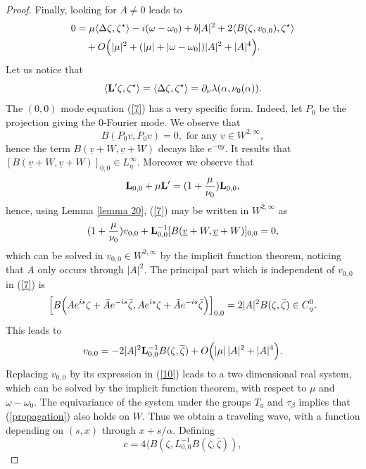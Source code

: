 \documentclass[11pt]{article}
\begin{document}
\begin{proof}
Finally, looking for $A \ne 0$ leads to
\begin{align} \label{10}
0 &= \mu \langle \Delta \zeta, \zeta^\star \rangle- i (\omega - \omega_0)
+ b |A|^2 + 2 \langle B(\zeta,v_{0,0}), \zeta^\star \rangle
\\ & \quad
+ O \Bigl(  |\mu|^2 + (|\mu| + |\omega - \omega_0| ) |A|^2 + |A|^4 \Bigr).
\end{align}
Let us notice that
$$
\langle {\bf L}' \zeta, \zeta^\star \rangle 
= \langle \Delta \zeta, \zeta^\star \rangle
= \partial_\nu \lambda(\alpha,\nu_0(\alpha)).
$$
The $(0,0)$ mode equation  (\ref{7}) has a very specific form. Indeed, let $P_0$ be the projection giving the 0-Fourier mode.  We observe that 
\begin{equation*}
B(P_0 v,P_0 v)=0,\text{   for any  }v\in W^{2,\infty},
\end{equation*}
hence the term $B(\underline{v} + W, \underline{v} + W )$ decays like $e^{-\eta y}$. It results that  $[B(\underline{v} + W, \underline{v} + W )]_{0,0} \in L_{\eta}^{\infty}$. Moreover we observe that
\begin{equation*}
{\bf L}_{0,0}+\mu {\bf L}'=(1+\frac{\mu}{\nu_0}){\bf L}_{0,0},
\end{equation*}
hence, using Lemma \ref{lemma 20}, (\ref{7}) may be written in $W^{2,\infty}$ as
\begin{equation*}
(1+\frac{\mu}{\nu_0})v_{0,0}+{\bf L}_{0,0}^{-1}[B(\underline{v} + W, \underline{v} + W )]_{0,0}=0,
\end{equation*}
which can be solved in $v_{0,0} \in W^{2,\infty}$ by the implicit function theorem, noticing that
 $A$ only occurs through $|A|^2$.
The principal part which is independent of $v_{0,0}$ in (\ref{7})
is
$$
\Bigl[ B \Bigl( A e^{i s} \zeta 
+ \bar A e^{- i s} \bar \zeta,
A e^{i s} \zeta + \bar A e^{-i s} \bar \zeta \Bigr) \Bigr]_{0,0}
= 2 | A|^2 B(\zeta, \bar \zeta) \in C^0_\eta.
$$
This leads to
$$
v_{0,0} = - 2 |A|^2 {\bf L}_{0,0}^{-1} B(\zeta, \overline{\zeta})
+ O \Bigl( |\mu | \, |A|^2 + |A|^4 \Bigr).
$$
Replacing $v_{0,0}$ by its expression
in (\ref{10}) leads to a two dimensional real system, which can be solved by the implicit
function theorem, with respect to $\mu$ and $\omega - \omega_0$.
The equivariance of the system under the groups $T_a$ and
$\tau_\beta$ 
implies that (\ref{propagation}) also holds on $W$.
Thus we obtain a traveling wave, with a function depending on $(s,x)$ through $x+s/\alpha$. 
Defining
$$
c = 4 \Big\langle B(\zeta, L_{0,0}^{-1} B(\zeta, \overline{\zeta})),
$$
\end{proof}
\end{document}
